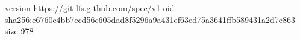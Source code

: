 version https://git-lfs.github.com/spec/v1
oid sha256:e6760e4bb7ccd56c605dad8f5296a9a431ef63ed75a3641ffb589431a2d7e863
size 978

